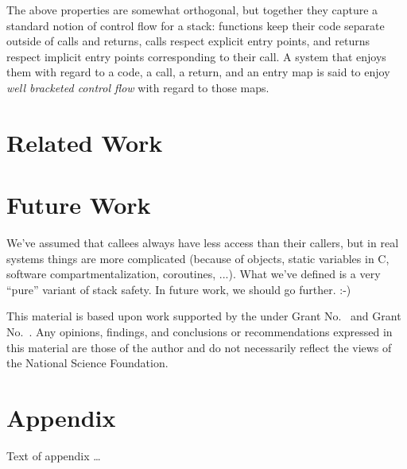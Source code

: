 \documentclass[acmsmall,review,anonymous]{acmart}\settopmatter{printfolios=true,printccs=false,printacmref=false}
\begin{document}

    The above properties are somewhat orthogonal, but together they capture a
    standard notion of control flow for a stack: functions keep their code
    separate outside of calls and returns, calls respect explicit entry points,
    and returns respect implicit entry points corresponding to their call.
    A system that enjoys them with regard to a code, a call, a return, and an
    entry map is said to enjoy {\em well bracketed control flow} with regard to
    those maps.

\section{Related Work}
\label{sec:relwork}

\section{Future Work}
\label{sec:future}

We've assumed that callees always have less access than their callers, but
in real systems things are more complicated (because of objects, static
variables in C, software compartmentalization, coroutines, ...).  What we've
defined is a very ``pure'' variant of stack safety.  In future work, we
should go further. :-)


\begin{acks}                            %
  This material is based upon work supported by the
   under Grant
  No.~ and Grant
  No.~.  Any opinions, findings, and
  conclusions or recommendations expressed in this material are those
  of the author and do not necessarily reflect the views of the
  National Science Foundation.
\end{acks}


%


\appendix
\section{Appendix}

Text of appendix \ldots
\end{document}
